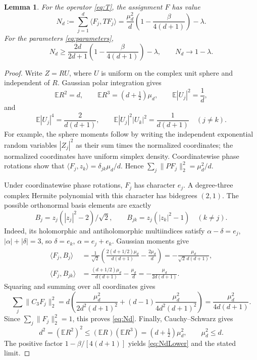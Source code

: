 \documentclass[11pt]{article}
\newtheorem{lemma}[theorem]{Lemma}
\theoremstyle{remark}\newtheorem{remark}[theorem]{Remark}
\newcommand{\E}{\mathbb E}
\newcommand{\ip}[2]{\langle #1,#2\rangle}
\newcommand{\norm}[1]{\lVert #1\rVert}
\begin{document}
\begin{lemma}\label{lem:vector}
For the operator \eqref{eq:T}, the assignment \(F\) has value
\begin{equation}\label{eq:Nd}
 N_d:=\sum_{j=1}^d\ip{F_j}{TF_j}
 =\frac{\mu_d^2}{d}\left(1-\frac{\beta}{4(d+1)}\right)-\lambda.
\end{equation}
For the parameters \eqref{eq:parameters},
\begin{equation}\label{eq:NdLower}
 N_d\ge\frac{2d}{2d+1}
 \left(1-\frac{\beta}{4(d+1)}\right)-\lambda,
 \qquad N_d\longrightarrow1-\lambda.
\end{equation}
\end{lemma}
\begin{proof}
Write \(Z=RU\), where \(U\) is uniform on the complex unit sphere
and independent of \(R\). Gaussian polar integration gives
\[
 \E R^2=d,\qquad \E R^3=(d+\tfrac12)\mu_d,
 \qquad \E|U_j|^2=\frac1d,
\]
and
\[
 \E|U_j|^4=\frac2{d(d+1)},\qquad
 \E|U_j|^2|U_k|^2=\frac1{d(d+1)}\quad(j\ne k).
\]
For example, the sphere moments follow by writing the independent
exponential random variables \(|Z_j|^2\) as their sum times the
normalized coordinates; the normalized coordinates have uniform
simplex density. Coordinatewise phase rotations show that
\(\ip{F_j}{z_k}=\delta_{jk}\mu_d/d\). Hence
\(\sum_j\norm{PF_j}_2^2=\mu_d^2/d\).

Under coordinatewise phase rotations, \(F_j\) has character \(e_j\).
A degree-three complex Hermite polynomial with this character has
bidegrees \((2,1)\). The possible orthonormal basis elements are
exactly
\[
 B_j=z_j(|z_j|^2-2)/\sqrt2,
 \qquad B_{jk}=z_j(|z_k|^2-1)\quad(k\ne j).
\]
Indeed, its holomorphic and antiholomorphic multiindices satisfy
\(\alpha-\delta=e_j\), \(|\alpha|+|\delta|=3\), so
\(\delta=e_k\), \(\alpha=e_j+e_k\). Gaussian moments give
\begin{align*}
 \ip{F_j}{B_j}
 &=\frac1{\sqrt2}\left(
 \frac{2(d+1/2)\mu_d}{d(d+1)}-\frac{2\mu_d}{d}\right)
 =-\frac{\mu_d}{\sqrt2\,d(d+1)},\\
 \ip{F_j}{B_{jk}}
 &=\frac{(d+1/2)\mu_d}{d(d+1)}-\frac{\mu_d}{d}
 =-\frac{\mu_d}{2d(d+1)}.
\end{align*}
Squaring and summing over all coordinates gives
\[
 \sum_j\norm{C_3F_j}_2^2
 =d\left(\frac{\mu_d^2}{2d^2(d+1)^2}
 +(d-1)\frac{\mu_d^2}{4d^2(d+1)^2}\right)
 =\frac{\mu_d^2}{4d(d+1)}.
\]
Since \(\sum_j\norm{F_j}_2^2=1\), this proves \eqref{eq:Nd}.
Finally, Cauchy--Schwarz gives
\[
 d^2=(\E R^2)^2\le(\E R)(\E R^3)
 =(d+\tfrac12)\mu_d^2,
 \qquad \mu_d^2\le d.
\]
The positive factor \(1-\beta/[4(d+1)]\) yields
\eqref{eq:NdLower} and the stated limit.
\end{proof}
\end{document}
